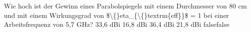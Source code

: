     {Wie hoch ist der Gewinn eines Parabolspiegels mit einem Durchmesser von 80 cm und mit einem Wirkungsgrad von \$\textbackslash\{\}eta\_\{\textbackslash\{\}textrm\{eff\}\}\$ = 1 bei einer Arbeitsfrequenz von 5,7 GHz?}
    {33,6 dBi}
    {16,8 dBi}
    {36,4 dBi}
    {21,8 dBi}
    {false}{false}